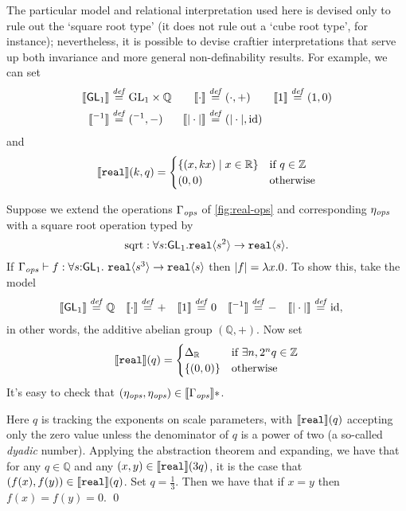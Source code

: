 The particular model and relational interpretation used here is devised only to
rule out the `square root type' (it does not rule out a `cube root type', for instance); 
nevertheless, it is possible to devise craftier interpretations that serve up both invariance
and more general non-definability results. For example, we can set
\begin{align*}
\semSort{\SynGL{1}} & \isDefinedAs \mathbb \mathbb \GL{1} \times \mathbb Q &
\semIndexExp{\cdot} & \isDefinedAs (\cdot,+) & 
\semIndexExp{1} & \isDefinedAs (1,0) \\
\semIndexExp{{}^{-1}} & \isDefinedAs \mathrm{({}^{-1},-)} &
\semIndexExp{|\cdot|} & \isDefinedAs \mathrm{(|\cdot|,\mathrm{id})}
\end{align*}
and
\[
\llbracket \textup{\texttt{real}} \rrbracket(k,q) = 
  {\begin{cases} \{(x,k x) \mathrel| x \in \mathbb R \} & \text{if }q \in \mathbb Z\\
                      {(0,0)} & \text{otherwise}
  \end{cases}}
\]

\begin{example}
Suppose we extend the operations $\Gamma_{\mathit{ops}}$ of \autoref{fig:real-ops}
and corresponding $\eta_{\mathit{ops}}$ with a square root operation typed by
\[
\mathrm{sqrt} : \forall s\mathord: \mathsf{GL}_1.\textup{\texttt{real}}\langle s^2 \rangle \to \textup{\texttt{real}}\langle s \rangle.
\]
If  $\Gamma_{\mathit{ops}} \vdash f : \forall s \mathord: \mathsf{GL}_1.\
\textup{\texttt{real}}\langle s^3 \rangle \to \textup{\texttt{real}}\langle s \rangle$ 
then $\left| f\right| = \lambda x.0$.
To show this, take the model
\begin{align*}
\llbracket \mathsf{GL}_1 \rrbracket & \stackrel{\mathit{def}}= \mathbb Q &
\llbracket \cdot \rrbracket & \stackrel{\mathit{def}}= + & 
\llbracket 1 \rrbracket & \stackrel{\mathit{def}}= 0 &
\llbracket {}^{-1} \rrbracket & \stackrel{\mathit{def}}= \mathrm{-} &
\llbracket |\cdot| \rrbracket & \stackrel{\mathit{def}}= \mathrm{id},
\end{align*}
in other words, the additive abelian group $(\mathbb Q, +)$. 
Now set
\[
\llbracket \textup{\texttt{real}} \rrbracket(q) =
\begin{cases} \Delta_{\mathbb R} & \text{if }\exists n, 2^n q \in\mathbb Z\\
\{(0,0)\} & \text{otherwise}
\end{cases}
\]
It's easy to check that $(\eta_{\mathit{ops}},\eta_{\mathit{ops}})\in\llbracket \Gamma_{\mathit{ops}} \rrbracket*$.

Here $q$ is tracking the exponents on scale parameters, with
$\llbracket \textup{\texttt{real}} \rrbracket(q)$ accepting only the zero value
unless the denominator of $q$ is a power of two (a so-called
\emph{dyadic} number).  
Applying the abstraction theorem and expanding, we have that for
any
$q\in\mathbb Q$ and any
$(x,y)\in\llbracket \textup{\texttt{real}} \rrbracket(3q)$, it is the case that
$(f(x),f(y))\in\llbracket \textup{\texttt{real}} \rrbracket(q)$. Set $q = \frac 1 3$.  
Then we have that if $x=y$ then $f(x)=f(y)=0$.
\qed
\end{example}

